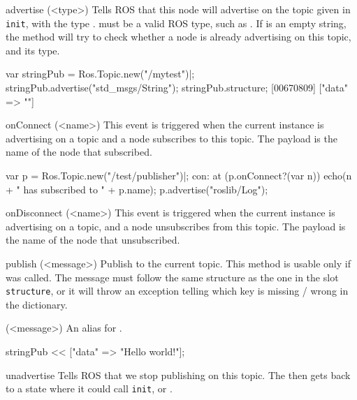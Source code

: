 \begin{urbiscriptapi}

\item[advertise](<type>)%
  Tells ROS that this node will advertise on the topic given in
  \lstinline{init}, with the type .  must be a valid ROS
  type, such as . If  is an empty string, the
  method will try to check whether a node is already advertising on this
  topic, and its type.
\begin{urbiscript}
var stringPub = Ros.Topic.new("/mytest")|;
stringPub.advertise("std_msgs/String");
stringPub.structure;
[00670809] ["data" => ""]
\end{urbiscript}


\item[onConnect](<name>)%
  This event is triggered when the current instance is advertising on a
  topic and a node subscribes to this topic. The payload  is the
  name of the node that subscribed.
\begin{urbiunchecked}
var p = Ros.Topic.new("/test/publisher")|;
con: at (p.onConnect?(var n))
  echo(n + " has subscribed to " + p.name);
p.advertise("roslib/Log");
\end{urbiunchecked}

\item[onDisconnect](<name>)%
  This event is triggered when the current instance is advertising on a
  topic, and a node unsubscribes from this topic. The payload is the name of
  the node that unsubscribed.

\item[publish](<message>)%
  Publish  to the current topic. This method is usable only if
   was called. The message must follow the same structure
  as the one in the slot \lstinline{structure}, or it will throw an
  exception telling which key is missing / wrong in the dictionary.

\item['<<'](<message>)%
  An alias for .
\begin{urbiunchecked}
stringPub << ["data" => "Hello world!"];
\end{urbiunchecked}


\item[unadvertise]%
  Tells ROS that we stop publishing on this topic. The \UObject then gets back
  to a state where it could call \lstinline{init},  or
  .
\end{urbiscriptapi}



